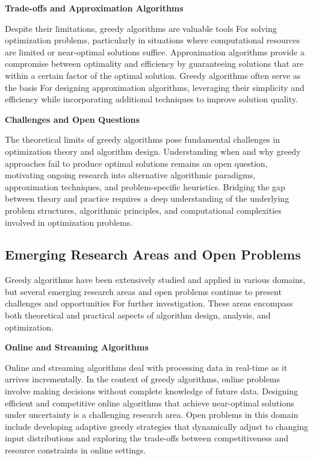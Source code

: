 \documentclass[12pt]{book} %
\begin{document}
\textbf{Trade-offs and Approximation Algorithms}

Despite their limitations, greedy algorithms are valuable tools For solving optimization problems, particularly in situations where computational resources are limited or near-optimal solutions suffice. Approximation algorithms provide a compromise between optimality and efficiency by guaranteeing solutions that are within a certain factor of the optimal solution. Greedy algorithms often serve as the basis For designing approximation algorithms, leveraging their simplicity and efficiency while incorporating additional techniques to improve solution quality.

\textbf{Challenges and Open Questions}

The theoretical limits of greedy algorithms pose fundamental challenges in optimization theory and algorithm design. Understanding when and why greedy approaches fail to produce optimal solutions remains an open question, motivating ongoing research into alternative algorithmic paradigms, approximation techniques, and problem-specific heuristics. Bridging the gap between theory and practice requires a deep understanding of the underlying problem structures, algorithmic principles, and computational complexities involved in optimization problems.

\subsection{Emerging Research Areas and Open Problems}

Greedy algorithms have been extensively studied and applied in various domains, but several emerging research areas and open problems continue to present challenges and opportunities For further investigation. These areas encompass both theoretical and practical aspects of algorithm design, analysis, and optimization.

\textbf{Online and Streaming Algorithms}

Online and streaming algorithms deal with processing data in real-time as it arrives incrementally. In the context of greedy algorithms, online problems involve making decisions without complete knowledge of future data. Designing efficient and competitive online algorithms that achieve near-optimal solutions under uncertainty is a challenging research area. Open problems in this domain include developing adaptive greedy strategies that dynamically adjust to changing input distributions and exploring the trade-offs between competitiveness and resource constraints in online settings.
\end{document}
